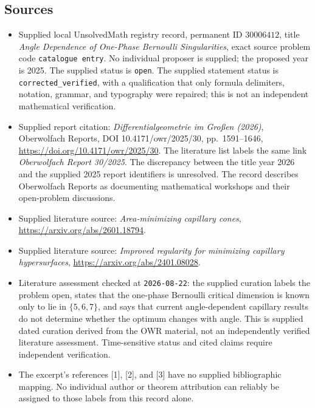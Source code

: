 \documentclass[11pt]{article}
\begin{document}
\subsection{Sources}
\begin{itemize}
\item Supplied local UnsolvedMath registry record, permanent ID \(30006412\), title \emph{Angle Dependence of One-Phase Bernoulli Singularities}, exact source problem code \texttt{catalogue entry}. No individual proposer is supplied; the proposed year is 2025. The supplied status is \texttt{open}. The supplied statement status is \texttt{corrected\_verified}, with a qualification that only formula delimiters, notation, grammar, and typography were repaired; this is not an independent mathematical verification.
\item Supplied report citation: \emph{Differentialgeometrie im Gro\ss en (2026)}, Oberwolfach Reports, DOI 10.4171/owr/2025/30, pp.~1591--1646, \url{https://doi.org/10.4171/owr/2025/30}. The literature list labels the same link \emph{Oberwolfach Report 30/2025}. The discrepancy between the title year 2026 and the supplied 2025 report identifiers is unresolved. The record describes Oberwolfach Reports as documenting mathematical workshops and their open-problem discussions.
\item Supplied literature source: \emph{Area-minimizing capillary cones}, \url{https://arxiv.org/abs/2601.18794}.
\item Supplied literature source: \emph{Improved regularity for minimizing capillary hypersurfaces}, \url{https://arxiv.org/abs/2401.08028}.
\item Literature assessment checked at \texttt{2026-08-22}: the supplied curation labels the problem open, states that the one-phase Bernoulli critical dimension is known only to lie in \(\{5,6,7\}\), and says that current angle-dependent capillary results do not determine whether the optimum changes with angle. This is supplied dated curation derived from the OWR material, not an independently verified literature assessment. Time-sensitive status and cited claims require independent verification.
\item The excerpt's references [1], [2], and [3] have no supplied bibliographic mapping. No individual author or theorem attribution can reliably be assigned to those labels from this record alone.
\end{itemize}
\end{document}
